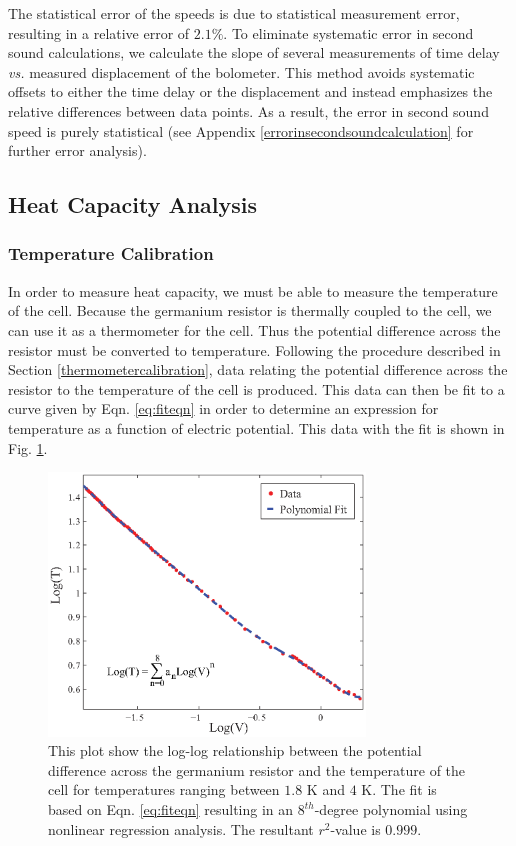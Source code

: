 The statistical error of the speeds is due to statistical measurement error, resulting in a relative error of $2.1\%$. To eliminate systematic error in second sound calculations, we calculate the slope of several measurements of time delay \emph{vs.} measured displacement of the bolometer. This method avoids systematic offsets to either the time delay or the displacement and instead emphasizes the relative differences between data points. As a result, the error in second sound speed is purely statistical (see Appendix \ref{errorinsecondsoundcalculation} for further error analysis).

\subsection{Heat Capacity Analysis}\label{heatcapacityanalysis}
\subsubsection{Temperature Calibration}\label{temperaturecalibration}

In order to measure heat capacity, we must be able to measure the temperature of the cell.  Because the germanium resistor is thermally coupled to the cell, we can use it as a thermometer for the cell.  Thus the potential difference across the resistor must be converted to temperature.  Following the procedure described in Section \ref{thermometercalibration}, data relating the potential difference across the resistor to the temperature of the cell is produced.  This data can then be fit to a curve given by Eqn. \ref{eq:fiteqn} in order to determine an expression for temperature as a function of electric potential.  This data with the fit is shown in Fig. \ref{fig:polyfit}.  

\begin{figure}[htbp]
\begin{center}
\includegraphics[height=70mm]{./figures/polyfit.eps}
\caption{\small{This plot show the log-log relationship between the potential difference across the germanium resistor and the temperature of the cell for temperatures ranging between $1.8$ K and $4$ K.  The fit is based on Eqn. \ref{eq:fiteqn} resulting in an $8^{th}$-degree polynomial using nonlinear regression analysis.  The resultant $r^{2}$-value is $0.999$.}}
\label{fig:polyfit}
\end{center}
\end{figure}

